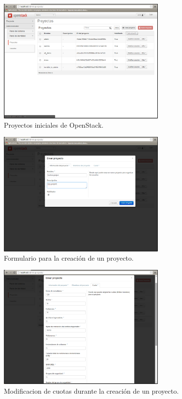 \documentclass{article}
\begin{document}
\begin{figure}[h]
  \centering
    \includegraphics[width=0.75\textwidth]{img/m_002.png}
  \caption{Proyectos iniciales de OpenStack.}
  \label{fig:AdminInitProjects}
\end{figure}

\begin{figure}[h]
  \centering
    \includegraphics[width=0.75\textwidth]{img/m_003.png}
  \caption{Formulario para la creación de un proyecto.}
  \label{fig:AdminFormCreateProject}
\end{figure}

\begin{figure}[h]
  \centering
    \includegraphics[width=0.75\textwidth]{img/m_004.png}
  \caption{Modificacion de cuotas durante la creación de un proyecto.}
  \label{fig:AdminFormCreateProjectQuotas}
\end{figure}
\end{document}
